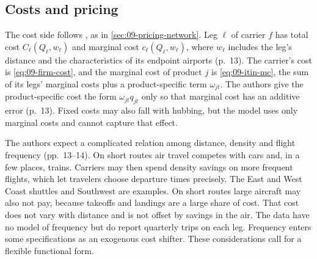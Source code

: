 \subsection{Costs and pricing}\label{sec:09-bcs-supply}

The cost side follows \citet{BruecknerSpiller1994}, as in \cref{sec:09-pricing-network}. Leg $\ell$ of carrier
$f$ has total cost $C_\ell(Q_\ell,w_\ell)$ and marginal cost $c_\ell(Q_\ell,w_\ell)$, where $w_\ell$
includes the leg's distance and the characteristics of its endpoint airports (p.~13). The carrier's cost is
\eqref{eq:09-firm-cost}, and the marginal cost of product $j$ is \eqref{eq:09-itin-mc}, the sum of its legs'
marginal costs plus a product-specific term $\omega_{jt}$. The authors give the product-specific cost the
form $\omega_{jt}q_{jt}$ only so that marginal cost has an additive error (p.~13). Fixed costs may also fall
with hubbing, but the model uses only marginal costs and cannot capture that effect.

The authors expect a complicated relation among distance, density and flight frequency (pp.~13--14). On short
routes air travel competes with cars and, in a few places, trains. Carriers may then spend density savings
on more frequent flights, which let travelers choose departure times precisely. The East and West Coast
shuttles and Southwest are examples. On short routes large aircraft may also not pay, because takeoffs and
landings are a large share of cost. That cost does not vary with distance and is not offset by savings in
the air. The data have no model of frequency but do report quarterly trips on each leg. Frequency enters
some specifications as an exogenous cost shifter. These considerations call for a flexible functional form.

